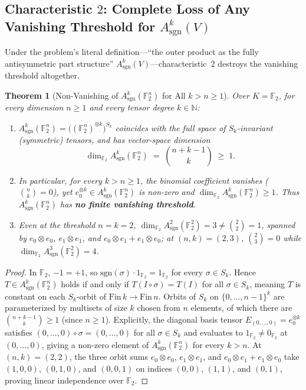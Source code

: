 \documentclass[11pt,a4paper]{article}
\newtheorem{theorem}{Theorem}[section]
\theoremstyle{definition}
\theoremstyle{remark}
\newcommand{\sgn}{\mathrm{sgn}}
\newcommand{\F}{\mathbb{F}}
\newcommand{\N}{\mathbb{N}}
\begin{document}
\subsection{Characteristic \texorpdfstring{$2$}{2}: Complete Loss of Any Vanishing Threshold for \texorpdfstring{$A^k_{\sgn}(V)$}{A\^k\_sgn(V)}}

Under the problem's literal definition---``the outer product as the fully antisymmetric part structure'' $A^k_{\sgn}(V)$---characteristic~$2$ destroys the vanishing threshold altogether.

\begin{theorem}[Non-Vanishing of $A^k_{\sgn}(\F_2^n)$ for All $k > n \ge 1$]\label{thm:char2-nonvanishing}
Over $K = \F_2$, for every dimension $n \ge 1$ and every tensor degree $k \in \N$:
\begin{enumerate}
\item[(a)] $A^k_{\sgn}(\F_2^n) = \bigl((\F_2^n)^{\otimes k}\bigr)^{S_k}$ coincides with the full space of $S_k$-invariant (symmetric) tensors, and has vector-space dimension
\[
  \dim_{\F_2} A^k_{\sgn}(\F_2^n) \;=\; \binom{n + k - 1}{k} \;\ge\; 1.
\]
\item[(b)] In particular, for \emph{every} $k > n \ge 1$, the binomial coefficient vanishes ($\binom{n}{k} = 0$), yet $e_0^{\otimes k} \in A^k_{\sgn}(\F_2^n)$ is non-zero and $\dim_{\F_2} A^k_{\sgn}(\F_2^n) \ge 1$. Thus $A^k_{\sgn}(\F_2^n)$ has \textbf{no finite vanishing threshold}.
\item[(c)] Even at the threshold $n = k = 2$, $\dim_{\F_2} A^2_{\sgn}(\F_2^2) = 3 \neq \binom{2}{2} = 1$, spanned by $e_0 \otimes e_0$, $e_1 \otimes e_1$, and $e_0 \otimes e_1 + e_1 \otimes e_0$; at $(n, k) = (2, 3)$, $\binom{2}{3} = 0$ while $\dim_{\F_2} A^3_{\sgn}(\F_2^2) = 4$.
\end{enumerate}
\end{theorem}

\begin{proof}
In $\F_2$, $-1 = +1$, so $\sgn(\sigma) \cdot 1_{\F_2} = 1_{\F_2}$ for every $\sigma \in S_k$. Hence $T \in A^k_{\sgn}(\F_2^n)$ holds if and only if $T(I \circ \sigma) = T(I)$ for all $\sigma \in S_k$, meaning $T$ is constant on each $S_k$-orbit of $\mathrm{Fin}\,k \to \mathrm{Fin}\,n$. Orbits of $S_k$ on $\{0,\dots,n-1\}^k$ are parameterized by multisets of size $k$ chosen from $n$ elements, of which there are $\binom{n+k-1}{k} \ge 1$ (since $n \ge 1$). Explicitly, the diagonal basis tensor $E_{(0,\dots,0)} = e_0^{\otimes k}$ satisfies $(0,\dots,0) \circ \sigma = (0,\dots,0)$ for all $\sigma \in S_k$ and evaluates to $1_{\F_2} \neq 0_{\F_2}$ at $(0,\dots,0)$, giving a non-zero element of $A^k_{\sgn}(\F_2^n)$ for every $k > n$. At $(n, k) = (2, 2)$, the three orbit sums $e_0 \otimes e_0$, $e_1 \otimes e_1$, and $e_0 \otimes e_1 + e_1 \otimes e_0$ take $(1,0,0)$, $(0,1,0)$, and $(0,0,1)$ on indices $(0,0)$, $(1,1)$, and $(0,1)$, proving linear independence over $\F_2$.
\end{proof}
\end{document}
